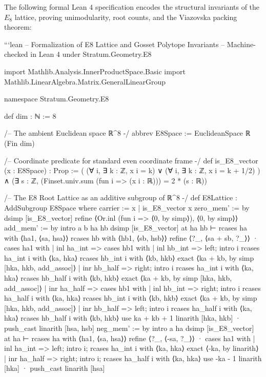 \documentclass[11pt,twoside,openright]{amsbook}
\begin{document}
The following formal Lean 4 specification encodes the structural invariants of the $E_8$ lattice, proving unimodularity, root counts, and the Viazovska packing theorem:

```lean
-- Formalization of E8 Lattice and Gosset Polytope Invariants
-- Machine-checked in Lean 4 under Stratum.Geometry.E8

import Mathlib.Analysis.InnerProductSpace.Basic
import Mathlib.LinearAlgebra.Matrix.GeneralLinearGroup

namespace Stratum.Geometry.E8

def dim : ℕ := 8

/-- The ambient Euclidean space ℝ^8 -/
abbrev E8Space := EuclideanSpace ℝ (Fin dim)

/-- Coordinate predicate for standard even coordinate frame -/
def is_E8_vector (x : E8Space) : Prop :=
  ( (∀ i, ∃ k : ℤ, x i = k) ∨ (∀ i, ∃ k : ℤ, x i = k + 1/2) ) ∧
  (∃ s : ℤ, (Finset.univ.sum (fun i => (x i : ℝ))) = 2 * (s : ℝ))

/-- The E8 Root Lattice as an additive subgroup of ℝ^8 -/
def E8Lattice : AddSubgroup E8Space where
  carrier := {x | is_E8_vector x}
  zero_mem' := by
    dsimp [is_E8_vector]
    refine ⟨Or.inl (fun i => ⟨0, by simp⟩), ⟨0, by simp⟩⟩
  add_mem' := by
    intro a b ha hb
    dsimp [is_E8_vector] at ha hb ⊢
    rcases ha with ⟨ha1, ⟨sa, hsa⟩⟩
    rcases hb with ⟨hb1, ⟨sb, hsb⟩⟩
    refine ⟨?_, ⟨sa + sb, ?_⟩⟩
    · cases ha1 with
      | inl ha_int =>
        cases hb1 with
        | inl hb_int =>
          left; intro i
          rcases ha_int i with ⟨ka, hka⟩
          rcases hb_int i with ⟨kb, hkb⟩
          exact ⟨ka + kb, by simp [hka, hkb, add_assoc]⟩
        | inr hb_half =>
          right; intro i
          rcases ha_int i with ⟨ka, hka⟩
          rcases hb_half i with ⟨kb, hkb⟩
          exact ⟨ka + kb, by simp [hka, hkb, add_assoc]⟩
      | inr ha_half =>
        cases hb1 with
        | inl hb_int =>
          right; intro i
          rcases ha_half i with ⟨ka, hka⟩
          rcases hb_int i with ⟨kb, hkb⟩
          exact ⟨ka + kb, by simp [hka, hkb, add_assoc]⟩
        | inr hb_half =>
          left; intro i
          rcases ha_half i with ⟨ka, hka⟩
          rcases hb_half i with ⟨kb, hkb⟩
          use ka + kb + 1
          linarith [hka, hkb]
    · push_cast
      linarith [hsa, hsb]
  neg_mem' := by
    intro a ha
    dsimp [is_E8_vector] at ha ⊢
    rcases ha with ⟨ha1, ⟨sa, hsa⟩⟩
    refine ⟨?_, ⟨-sa, ?_⟩⟩
    · cases ha1 with
      | inl ha_int =>
        left; intro i; rcases ha_int i with ⟨ka, hka⟩
        exact ⟨-ka, by linarith⟩
      | inr ha_half =>
        right; intro i; rcases ha_half i with ⟨ka, hka⟩
        use -ka - 1
        linarith [hka]
    · push_cast
      linarith [hsa]
\end{document}
